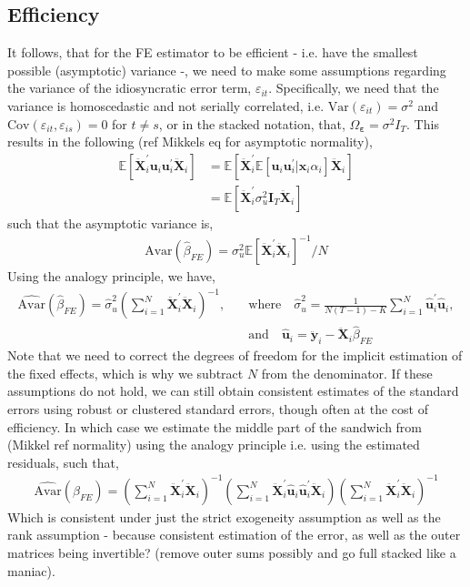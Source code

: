 \subsection{Efficiency}

It follows, that for the FE estimator to be efficient - i.e. have the smallest possible (asymptotic) variance -, we need to make some assumptions regarding the variance of the idiosyncratic error term, $\varepsilon_{it}$. Specifically, we need that the variance is homoscedastic and not serially correlated, i.e. $\text{Var}(\varepsilon_{it}) = \sigma^2$ and $\text{Cov}(\varepsilon_{it}, \varepsilon_{is}) = 0$ for $t \neq s$, or in the stacked notation, that, $\Omega_{\bm{\varepsilon}} = \sigma^2 I_T$. This results in the following (ref Mikkels eq for asymptotic normality), 
\begin{align*}
    \mathbb{E}\left[ \bm{\ddot{X}}_i^\prime \bm{u}_i \bm{u}_i^\prime \bm{\ddot{X}}_i \right] &= \mathbb{E}\left[ \bm{\ddot{X}}_i^\prime \mathbb{E}[\bm{u}_i \bm{u}_i^\prime | \bm{x}_i \alpha_i]\bm{\ddot{X}}_i \right] \\
    &= \mathbb{E}[\ddot{\bm{X}}_i^\prime \sigma_u^2 \bm{I}_T \bm{\ddot{X}}_i]
\end{align*}
such that the asymptotic variance is,
\begin{align*}
    \text{Avar}(\hat{\beta}_{FE}) = \sigma_u^2 \mathbb{E}[\bm{\ddot{X}}_i^\prime \bm{\ddot{X}}_i]^{-1} / N
\end{align*}
Using the analogy principle, we have, 
\begin{align*}
    \hat{\text{Avar}}(\hat{\beta}_{FE}) = \hat{\sigma}_u^2 \left( \sum_{i=1}^N \bm{\ddot{X}}_i^\prime \bm{\ddot{X}}_i \right)^{-1}, \quad &\text{where} \quad \hat{\sigma}_u^2 = \frac{1}{N(T-1) - K} \sum_{i=1}^N \hat{\bm{u}}_i^\prime \hat{\bm{u}}_i, \\
    &\text{and} \quad \hat{\bm{u}}_i = \bm{\ddot{y}}_i - \bm{\ddot{X}}_i \hat{\beta}_{FE}
\end{align*}
Note that we need to correct the degrees of freedom for the implicit estimation of the fixed effects, which is why we subtract $N$ from the denominator. If these assumptions do not hold, we can still obtain consistent estimates of the standard errors using robust or clustered standard errors, though often at the cost of efficiency. In which case we estimate the middle part of the sandwich from (Mikkel ref normality) using the analogy principle i.e. using the estimated residuals, such that, 
\begin{align*}
    \hat{\text{Avar}}(\hat{\beta}_{FE}) = \left( \sum_{i=1}^N \bm{\ddot{X}}_i^\prime \bm{\ddot{X}}_i \right)^{-1} \left( \sum_{i=1}^N \bm{\ddot{X}}_i^\prime \hat{\bm{u}}_i \hat{\bm{u}}_i^\prime \bm{\ddot{X}}_i \right) \left( \sum_{i=1}^N \bm{\ddot{X}}_i^\prime \bm{\ddot{X}}_i \right)^{-1}
\end{align*} 
Which is consistent under just the strict exogeneity assumption as well as the rank assumption - because consistent estimation of the error, as well as the outer matrices being invertible? (remove outer sums possibly and go full stacked like a maniac). 